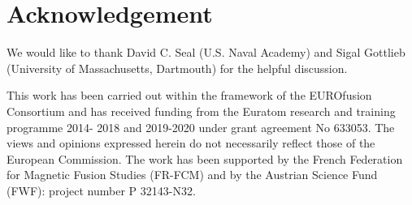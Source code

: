\section*{Acknowledgement}

We would like to thank David C. Seal (U.S. Naval Academy) and Sigal Gottlieb (University of Massachusetts, Dartmouth) for the helpful discussion.

This work has been carried out within the framework of the EUROfusion Consortium and has received funding from the Euratom research and training programme 2014- 2018 and 2019-2020 under grant agreement No 633053. The views and opinions expressed herein do not necessarily reflect those of the European Commission. The work has been supported by the French Federation for Magnetic Fusion Studies (FR-FCM) and by the Austrian Science Fund (FWF): project number P 32143-N32. 

